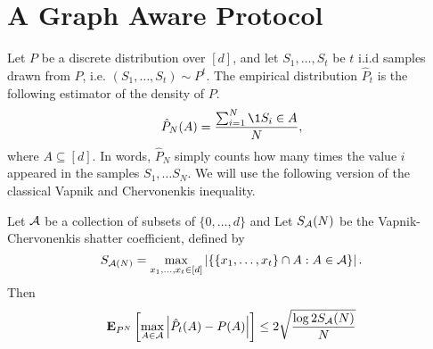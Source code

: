 \section{A Graph Aware Protocol}\label{s:graph_aware}
Let $P$ be a discrete distribution over $[d]$, and let
$S_1, \ldots, S_t$ be $t$ i.i.d samples drawn from $P$, i.e.
$(S_1, \ldots, S_t) \sim P^t$.
The empirical distribution $\hat{P}_t$ is the following estimator of
the density of $P$.
\begin{equation}\label{eq:empirical_distribution}
  \hat{P}_N(A) = \frac{\sum_{i=1}^N \1{S_i \in A}}{N},
\end{equation}
where $A \subseteq [d]$. In words, $\hat{P}_N$ simply counts
how many times the value $i$ appeared in the samples $S_1, \ldots S_N$.
We will use the following version of the classical Vapnik and
Chervonenkis inequality.
\begin{lemma}\label{l:vc_inequality}
  Let $\mathcal{A}$ be a collection of subsets of $\{0,\ldots, d\}$ and
  Let $S_{\mathcal{A}}(N)$ be the Vapnik-Chervonenkis shatter coefficient, defined
  by
  \[
    S_{\mathcal{A}(N)} = \max_{x_1,\ldots, x_t \in [d]}
    \left| \{ \{x_1, \ldots, x_t\} \cap A : A \in \mathcal{A} \} \right|.
  \]
  Then
  \[
    \bm{\mathrm{E}}_{P^N} \left[ \max_{A \in \mathcal{A}} \left| \hat{P}_t(A) - P(A) \right| \right]
    \leq 2 \sqrt{\frac{\log{2 S_{\mathcal{A}}(N)}}{N}}
  \]
\end{lemma}

